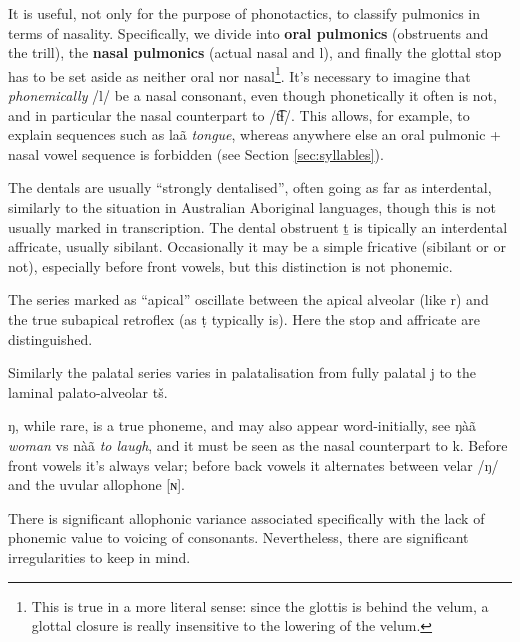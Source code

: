\documentclass[11pt,a5paper]{book}
\newcommand{\qcn}[1]{\textcolor{AccentText}{\large#1}}
\newcommand{\transl}[2]{\qcn{#1} \emph{#2}}
\begin{document}
It is useful, not only for the purpose of phonotactics, to classify pulmonics in terms of nasality. Specifically, we divide into \textbf{oral pulmonics} (obstruents and the trill), the \textbf{nasal pulmonics} (actual nasal and \qcn{l}), and finally the glottal stop has to be set aside as neither oral nor nasal\footnote{This is true in a more literal sense: since the glottis is behind the velum, a glottal closure is really insensitive to the lowering of the velum.}. It's necessary to imagine that \emph{phonemically} /l/ be a nasal consonant, even though phonetically it often is not, and in particular the nasal counterpart to /t͡ɬ/. This allows, for example, to explain sequences such as \transl{laã}{tongue}, whereas anywhere else an oral pulmonic + nasal vowel sequence is forbidden (see Section \ref{sec:syllables}).

The dentals are usually ``strongly dentalised'', often going as far as interdental, similarly to the situation in Australian Aboriginal languages, though this is not usually marked in transcription. The dental obstruent \qcn{ṯ} is tipically an interdental affricate, usually sibilant. Occasionally it may be a simple fricative (sibilant or or not), especially before front vowels, but this distinction is not phonemic.

The series marked as ``apical'' oscillate between the apical alveolar (like \qcn{r}) and the true subapical retroflex (as \qcn{ṭ} typically is). Here the stop and affricate are distinguished.

Similarly the palatal series varies in palatalisation from fully palatal \qcn{j} to the laminal palato-alveolar \qcn{tš}.

\qcn{ŋ}, while rare, is a true phoneme, and may also appear word-initially, see \transl{ŋàã}{woman} vs \transl{nàã}{to laugh}, and it must be seen as the nasal counterpart to \qcn{k}. Before front vowels it's always velar; before back vowels it alternates between velar /ŋ/ and the uvular allophone [ɴ].



There is significant allophonic variance associated specifically with the lack of phonemic value to voicing of consonants. Nevertheless, there are significant irregularities to keep in mind.
\end{document}
